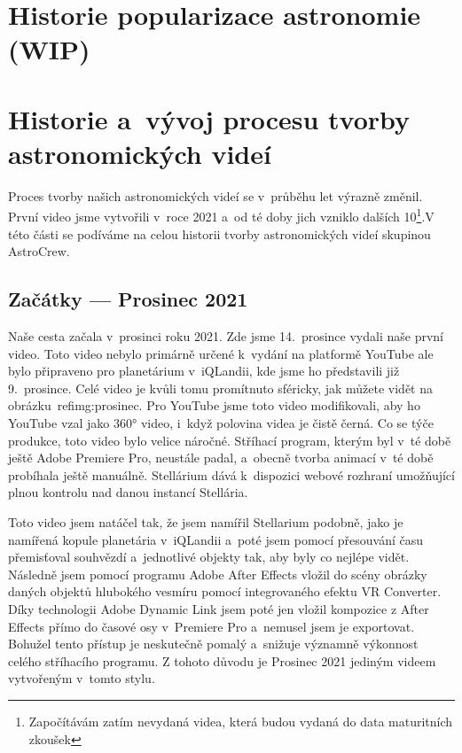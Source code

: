 \documentclass[12pt,a4paper,titlepage]{article}
\begin{document}
\section{Historie popularizace astronomie (WIP)}

\section{Historie a~vývoj procesu tvorby astronomických videí}
Proces tvorby našich astronomických videí se v~průběhu let výrazně změnil. První video jsme vytvořili v~roce 2021 a~od té doby jich vzniklo dalších 10\footnote{Započítávám zatím nevydaná videa, která budou vydaná do data maturitních zkoušek}.V této části se podíváme na celou historii tvorby astronomických videí skupinou AstroCrew.
\subsection{Začátky --- Prosinec 2021}
Naše cesta začala v~prosinci roku 2021. Zde jsme 14.\ prosince vydali naše první video. Toto video nebylo primárně určené k~vydání na platformě YouTube ale bylo připraveno pro planetárium v~iQLandii, kde jsme ho představili již 9.\ prosince. Celé video je kvůli tomu promítnuto sféricky, jak můžete vidět na obrázku~ref{img:prosinec}. Pro YouTube jsme toto video modifikovali, aby ho YouTube vzal jako 360° video, i~když polovina videa je čistě černá. Co se týče produkce, toto video bylo velice náročné. Stříhací program, kterým byl v~té době ještě Adobe Premiere Pro, neustále padal, a~obecně tvorba animací v~té době probíhala ještě manuálně. Stellárium dává k~dispozici webové rozhraní umožňující plnou kontrolu nad danou instancí Stellária. 

Toto video jsem natáčel tak, že jsem namířil Stellarium podobně, jako je namířená kopule planetária v~iQLandii a~poté jsem pomocí přesouvání času přemisťoval souhvězdí a~jednotlivé objekty tak, aby byly co nejlépe vidět. Následně jsem pomocí programu Adobe After Effects vložil do scény obrázky daných objektů hlubokého vesmíru pomocí integrovaného efektu VR Converter. Díky technologii Adobe Dynamic Link jsem poté jen vložil kompozice z After Effects přímo do časové osy v~Premiere Pro a~nemusel jsem je exportovat. Bohužel tento přístup je neskutečně pomalý a~snižuje významně výkonnost celého stříhacího programu. Z tohoto důvodu je Prosinec 2021 jediným videem vytvořeným v~tomto stylu.
\end{document}

